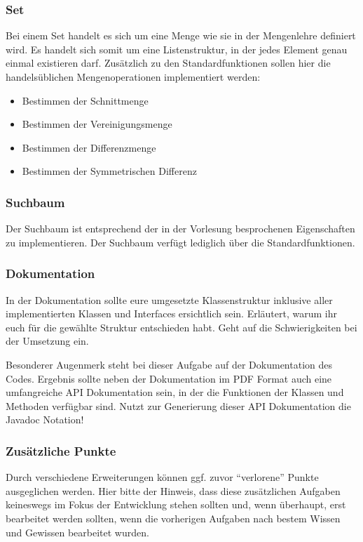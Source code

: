 \documentclass[a4paper,
			   fontsize=12pt]{article}
\begin{document}
\subsubsection*{Set}
Bei einem Set handelt es sich um eine Menge wie sie in der Mengenlehre definiert wird. Es handelt sich somit um eine Listenstruktur, in der jedes Element genau einmal existieren darf. Zusätzlich zu den Standardfunktionen sollen hier
die handelsüblichen Mengenoperationen implementiert werden:
\begin{itemize}
	\item Bestimmen der Schnittmenge
	\item Bestimmen der Vereinigungsmenge
	\item Bestimmen der Differenzmenge
	\item Bestimmen der Symmetrischen Differenz
\end{itemize}

\subsubsection*{Suchbaum}
Der Suchbaum ist entsprechend der in der Vorlesung besprochenen Eigenschaften zu implementieren. Der Suchbaum verfügt lediglich über die Standardfunktionen.

\subsubsection*{Dokumentation}
In der Dokumentation sollte eure umgesetzte Klassenstruktur inklusive aller implementierten Klassen und Interfaces ersichtlich sein. Erläutert, warum ihr euch für die
gewählte Struktur entschieden habt. Geht auf die Schwierigkeiten bei der Umsetzung ein.

Besonderer Augenmerk steht bei dieser Aufgabe auf der Dokumentation des Codes. Ergebnis sollte neben der Dokumentation im PDF Format auch eine umfangreiche API Dokumentation
sein, in der die Funktionen der Klassen und Methoden verfügbar sind. Nutzt zur Generierung dieser API Dokumentation die Javadoc Notation!

\subsubsection*{Zusätzliche Punkte}
Durch verschiedene Erweiterungen können ggf. zuvor "`verlorene"' Punkte ausgeglichen werden. Hier bitte der Hinweis, dass diese zusätzlichen Aufgaben keineswegs im Fokus der Entwicklung
stehen sollten und, wenn überhaupt, erst bearbeitet werden sollten, wenn die vorherigen Aufgaben nach bestem Wissen und Gewissen bearbeitet wurden.
\end{document}
